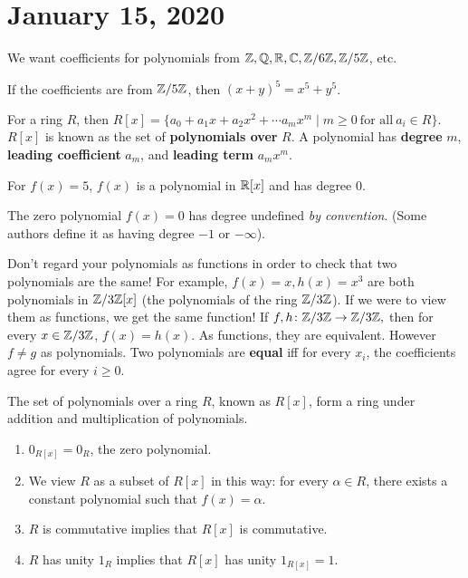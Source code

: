 \section{January 15, 2020}
We want coefficients for polynomials from $\mathbb{Z},\mathbb{Q},\mathbb{R},\mathbb{C}, \mathbb{Z} / 6\mathbb{Z}, \mathbb{Z} /5\mathbb{Z}$, etc. 
\begin{example}
    If the coefficients are from $\mathbb{Z} /5 \mathbb{Z}$, then $(x+y)^5=x^5+y^5$.
\end{example}
\begin{definition}
    For a ring $R$, then $R[x]= \{a_0+a_1x +a_2 x^2+ \cdots a_m x^m  \mid m \geq 0 \ \text{for all} \ a_i  \in R\} $. $R[x]$ is known as the set of \textbf{polynomials over} $R$. A polynomial has \textbf{degree} $m$, \textbf{leading coefficient} $a_m$, and \textbf{leading term} $a_mx^m$.
\end{definition}
\begin{example}
    For $f(x)=5$, $f(x)$ is a polynomial in $\mathbb{R}[x]$ and has degree 0. 
\end{example}
\begin{note}
    The zero polynomial $f(x)=0$ has degree undefined \emph{by convention}. (Some authors define it as having degree $-1$ or $-\infty$).
\end{note}
\begin{note}
    Don't regard your polynomials as functions in order to check that two polynomials are the same! For example, $f(x)=x,h(x)=x^3$ are both polynomials in $\mathbb{Z} /3 \mathbb{Z}[x]$ (the polynomials of the ring $\mathbb{Z} /3 \mathbb{Z}$). If we were to view them as functions, we get the same function! If $f,h \colon \mathbb{Z} /3 \mathbb{Z} \to \mathbb{Z} /3 \mathbb{Z},$ then for every $x \in \mathbb{Z} /3 \mathbb{Z}$, $f(x)=h(x)$. As functions, they are equivalent. However $f \neq g$ as polynomials. Two polynomials are \textbf{equal} iff for every $x_i $, the coefficients agree for every $i \geq 0$.
\end{note}
\begin{theorem}
    The set of polynomials over a ring $R$, known as $R[x]$, form a ring under addition and multiplication of polynomials. 
    \begin{enumerate}[label=(\arabic*)]
    \setlength\itemsep{-.2em}
\item $0_{R[x]}=0_R$, the zero polynomial.
\item We view $R$ as a subset of $R[x]$ in this way: for every $
    \alpha  \in R$, there exists a constant polynomial such that $f(x)=\alpha $.
\item $R$ is commutative implies that $R[x]$ is commutative.
\item $R$ has unity $1_R$ implies that $R[x]$ has unity $1_{R[x]}=1$.
    \end{enumerate}
\end{theorem}
